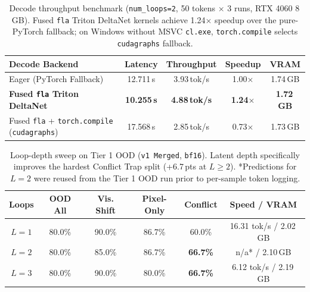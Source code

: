 \documentclass[10pt,letterpaper]{article}
\begin{document}
\begin{table}[t]
\centering
\caption{Decode throughput benchmark (\texttt{num\_loops=2}, 50 tokens $\times$ 3 runs, RTX 4060 8\,GB). Fused \texttt{fla} Triton DeltaNet kernels achieve 1.24$\times$ speedup over the pure-PyTorch fallback; on Windows without MSVC \texttt{cl.exe}, \texttt{torch.compile} selects \texttt{cudagraphs} fallback.}
\label{tab:speedup}
\small
\begin{tabular}{@{}lcccc@{}}
\toprule
\textbf{Decode Backend} & \textbf{Latency} & \textbf{Throughput} & \textbf{Speedup} & \textbf{VRAM} \\
\midrule
Eager (PyTorch Fallback) & 12.711\,s & 3.93\,tok/s & 1.00$\times$ & 1.74\,GB \\
\textbf{Fused \texttt{fla} Triton DeltaNet} & \textbf{10.255\,s} & \textbf{4.88\,tok/s} & \textbf{1.24$\times$} & \textbf{1.72\,GB} \\
Fused \texttt{fla} + \texttt{torch.compile} (\texttt{cudagraphs}) & 17.568\,s & 2.85\,tok/s & 0.73$\times$ & 1.73\,GB \\
\bottomrule
\end{tabular}
\end{table}

\begin{table}[t]
\centering
\caption{Loop-depth sweep on Tier 1 OOD (\texttt{v1 Merged}, \texttt{bf16}). Latent depth specifically improves the hardest Conflict Trap split (+6.7\,pts at $L \ge 2$). *Predictions for $L=2$ were reused from the Tier 1 OOD run prior to per-sample token logging.}
\label{tab:loop_sweep}
\small
\begin{tabular}{@{}cccccc@{}}
\toprule
\textbf{Loops} & \textbf{OOD All} & \textbf{Vis. Shift} & \textbf{Pixel-Only} & \textbf{Conflict} & \textbf{Speed / VRAM} \\
\midrule
$L=1$ & 80.0\% & 90.0\% & 86.7\% & 60.0\% & 16.31 tok/s / 2.02\,GB \\
$L=2$ & 80.0\% & 85.0\% & 86.7\% & \textbf{66.7\%} & n/a* / 2.10\,GB \\
$L=3$ & 80.0\% & 90.0\% & 80.0\% & \textbf{66.7\%} & 6.12 tok/s / 2.19\,GB \\
\bottomrule
\end{tabular}
\end{table}
\end{document}
